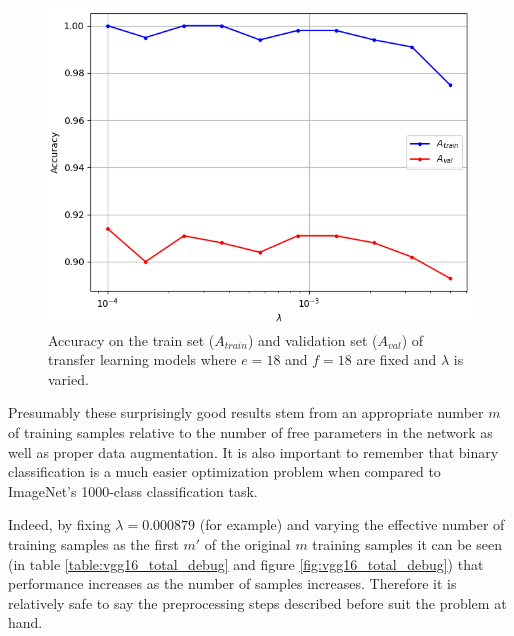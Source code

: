 \begin{figure}[ht]
    \centering
    \includegraphics[width=1.0\textwidth]{figs/vgg16_total_lambda.png}
    \caption{Accuracy on the train set ($A_{train}$) and validation set ($A_{val}$) of transfer learning models where $e = 18$ and $f = 18$ are fixed and $\lambda$ is varied.}
    \label{fig:vgg16_total_lambda}
\end{figure}

Presumably these surprisingly good results stem from an appropriate number $m$ of training samples relative to the number of free parameters in the network as well as proper data augmentation. It is also important to remember that binary classification is a much easier optimization problem when compared to ImageNet's 1000-class classification task.

Indeed, by fixing $\lambda = 0.000879$ (for example) and varying the effective number of training samples as the first $m'$ of the original $m$ training samples it can be seen (in table \ref{table:vgg16_total_debug} and figure \ref{fig:vgg16_total_debug}) that performance increases as the number of samples increases. Therefore it is relatively safe to say the preprocessing steps described before suit the problem at hand.

